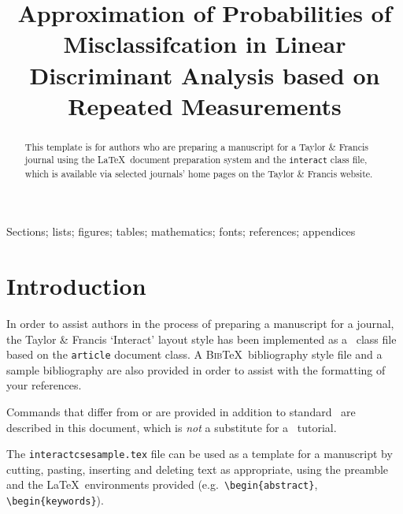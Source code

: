 \documentclass[]{interact}
\theoremstyle{plain}%
\theoremstyle{definition}
\theoremstyle{remark}
\begin{document}

\title{Approximation of Probabilities of Misclassifcation in Linear Discriminant Analysis based on Repeated Measurements}

\author{
}

\maketitle

\begin{abstract}
This template is for authors who are preparing a manuscript for a Taylor \& Francis journal using the \LaTeX\ document preparation system and the \texttt{interact} class file, which is available via selected journals' home pages on the Taylor \& Francis website.
\end{abstract}

\begin{keywords}
Sections; lists; figures; tables; mathematics; fonts; references; appendices
\end{keywords}


\section{Introduction}

In order to assist authors in the process of preparing a manuscript for a journal, the Taylor \& Francis `\textsf{Interact}' layout style has been implemented as a \LaTeXe\ class file based on the \texttt{article} document class. A \textsc{Bib}\TeX\ bibliography style file and a sample bibliography are also provided in order to assist with the formatting of your references.

Commands that differ from or are provided in addition to standard \LaTeXe\ are described in this document, which is \emph{not} a substitute for a \LaTeXe\ tutorial.

The \texttt{interactcsesample.tex} file can be used as a template for a manuscript by cutting, pasting, inserting and deleting text as appropriate, using the preamble and the \LaTeX\ environments provided (e.g.\ \verb"\begin{abstract}", \verb"\begin{keywords}").
\end{document}
